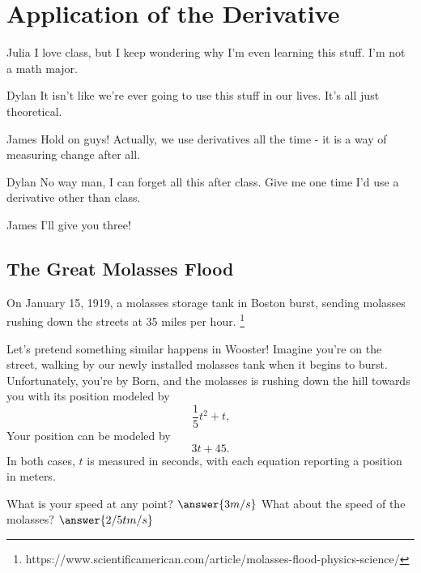 \documentclass[handout]{ximera}
\begin{document}
\section{Application of the Derivative}
\begin{dialogue}
\item[Julia] I love class, but I keep wondering why I'm even learning this stuff. I'm not a math major.
\item[Dylan] It isn't like we're ever going to use this stuff in our lives. It's all just theoretical.
\item[James] Hold on guys! Actually, we use derivatives all the time - it is a way of measuring change after all.
\item[Dylan] No way man, I can forget all this after class. Give me one time I'd use a derivative other than class.
\item[James] I'll give you three!
\end{dialogue}
\subsection{The Great Molasses Flood}
On January 15, 1919, a molasses storage tank in Boston burst, sending molasses rushing down the streets at 35 miles per hour. \footnote{https://www.scientificamerican.com/article/molasses-flood-physics-science/}

Let's pretend something similar happens in Wooster! Imagine you're on the street, walking by our newly installed molasses tank when it begins to burst. Unfortunately, you're by Born, and the molasses is rushing down the hill towards you with its position modeled by $$\frac{1}{5}t^2+t \text{,}$$ Your position can be modeled by $$3t+45 \text{.}$$ In both cases, $t$ is measured in seconds, with each equation reporting a position in meters.

\setcounter{problem}{0}
\begin{question}
What is your speed at any point?  $\answer{3 m/s}$
What about the speed of the molasses? $\answer{2/5 t m/s}$
\end{question}
\end{document}
